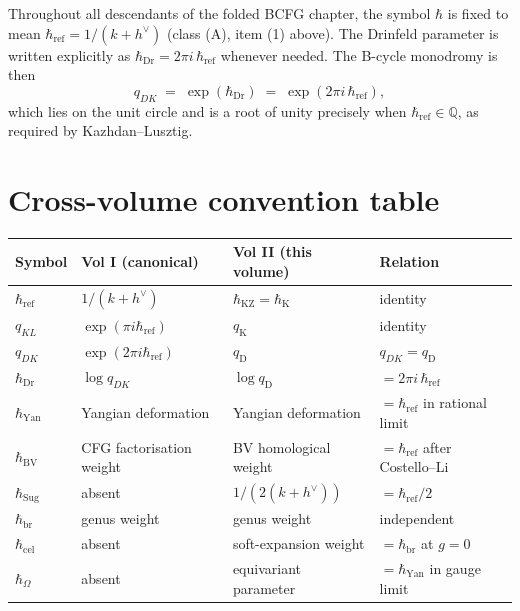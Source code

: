 \begin{resolution}
Throughout all descendants of the folded BCFG chapter, the symbol $\hbar$ is
fixed to mean $\hbar_{\mathrm{ref}} = 1/(k+h^\vee)$ (class (A), item (1)
above). The Drinfeld parameter is written explicitly as
$\hbar_{\mathrm{Dr}} = 2\pi i\,\hbar_{\mathrm{ref}}$ whenever needed. The
B-cycle monodromy is then
\[
 q_{DK} \;=\; \exp(\hbar_{\mathrm{Dr}}) \;=\; \exp(2\pi i\,\hbar_{\mathrm{ref}}),
\]
which lies on the unit circle and is a root of unity precisely when
$\hbar_{\mathrm{ref}}\in\mathbb{Q}$, as required by Kazhdan--Lusztig.
\end{resolution}

\section{Cross-volume convention table}
\label{sec:cross-vol-conventions}

\begin{center}
\begin{tabular}{llll}
\hline
Symbol & Vol I (canonical) & Vol II (this volume) & Relation \\
\hline
$\hbar_{\mathrm{ref}}$ & $1/(k+h^\vee)$ & $\hbar_{\mathrm{KZ}}=\hbar_{\mathrm{K}}$ & identity \\
$q_{KL}$ & $\exp(\pi i\hbar_{\mathrm{ref}})$ & $q_{\mathrm{K}}$ & identity \\
$q_{DK}$ & $\exp(2\pi i\hbar_{\mathrm{ref}})$ & $q_{\mathrm{D}}$ & $q_{DK}=q_{\mathrm{D}}$ \\
$\hbar_{\mathrm{Dr}}$ & $\log q_{DK}$ & $\log q_{\mathrm{D}}$ & $=2\pi i\,\hbar_{\mathrm{ref}}$ \\
$\hbar_{\mathrm{Yan}}$ & Yangian deformation & Yangian deformation & $=\hbar_{\mathrm{ref}}$ in rational limit \\
$\hbar_{\mathrm{BV}}$ & CFG factorisation weight & BV homological weight & $=\hbar_{\mathrm{ref}}$ after Costello--Li \\
$\hbar_{\mathrm{Sug}}$ & absent & $1/(2(k+h^\vee))$ & $=\hbar_{\mathrm{ref}}/2$ \\
$\hbar_{\mathrm{br}}$ & genus weight & genus weight & independent \\
$\hbar_{\mathrm{cel}}$ & absent & soft-expansion weight & $=\hbar_{\mathrm{br}}$ at $g{=}0$ \\
$\hbar_{\Omega}$ & absent & equivariant parameter & $=\hbar_{\mathrm{Yan}}$ in gauge limit \\
\hline
\end{tabular}
\end{center}

